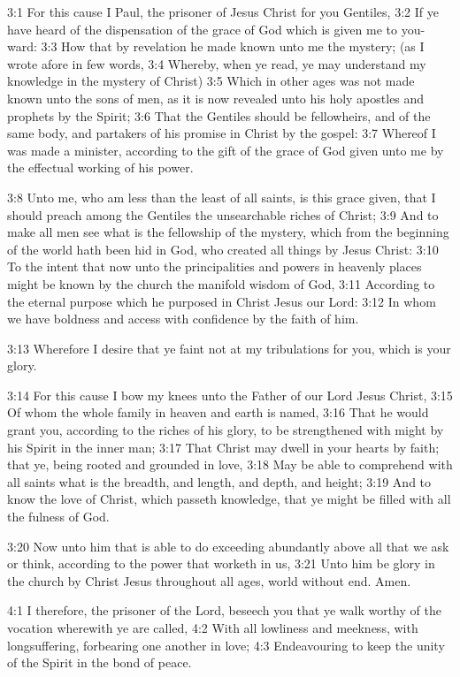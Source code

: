 3:1 For this cause I Paul, the prisoner of Jesus Christ for you
Gentiles, 3:2 If ye have heard of the dispensation of the grace of God
which is given me to you-ward: 3:3 How that by revelation he made
known unto me the mystery; (as I wrote afore in few words, 3:4
Whereby, when ye read, ye may understand my knowledge in the mystery
of Christ) 3:5 Which in other ages was not made known unto the sons of
men, as it is now revealed unto his holy apostles and prophets by the
Spirit; 3:6 That the Gentiles should be fellowheirs, and of the same
body, and partakers of his promise in Christ by the gospel: 3:7
Whereof I was made a minister, according to the gift of the grace of
God given unto me by the effectual working of his power.

3:8 Unto me, who am less than the least of all saints, is this grace
given, that I should preach among the Gentiles the unsearchable riches
of Christ; 3:9 And to make all men see what is the fellowship of the
mystery, which from the beginning of the world hath been hid in God,
who created all things by Jesus Christ: 3:10 To the intent that now
unto the principalities and powers in heavenly places might be known
by the church the manifold wisdom of God, 3:11 According to the
eternal purpose which he purposed in Christ Jesus our Lord: 3:12 In
whom we have boldness and access with confidence by the faith of him.

3:13 Wherefore I desire that ye faint not at my tribulations for you,
which is your glory.

3:14 For this cause I bow my knees unto the Father of our Lord Jesus
Christ, 3:15 Of whom the whole family in heaven and earth is named,
3:16 That he would grant you, according to the riches of his glory, to
be strengthened with might by his Spirit in the inner man; 3:17 That
Christ may dwell in your hearts by faith; that ye, being rooted and
grounded in love, 3:18 May be able to comprehend with all saints what
is the breadth, and length, and depth, and height; 3:19 And to know
the love of Christ, which passeth knowledge, that ye might be filled
with all the fulness of God.

3:20 Now unto him that is able to do exceeding abundantly above all
that we ask or think, according to the power that worketh in us, 3:21
Unto him be glory in the church by Christ Jesus throughout all ages,
world without end. Amen.

4:1 I therefore, the prisoner of the Lord, beseech you that ye walk
worthy of the vocation wherewith ye are called, 4:2 With all lowliness
and meekness, with longsuffering, forbearing one another in love; 4:3
Endeavouring to keep the unity of the Spirit in the bond of peace.

